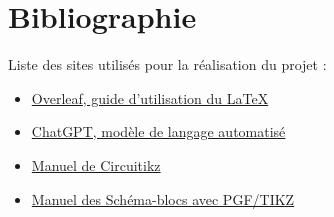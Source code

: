 \documentclass[11pt,a4paper]{article}
\begin{document}
\pagebreak
\section{Bibliographie}
Liste des sites utilisés pour la réalisation du projet :
\begin{itemize}
\item \href{https://www.overleaf.com/learn}{Overleaf, guide d'utilisation du \LaTeX{}}
\item \href{https://chat.openai.com/chat}{ChatGPT, modèle de langage automatisé}
\item \href{https://ctan.mines-albi.fr/graphics/pgf/contrib/circuitikz/doc/circuitikzmanual.pdf}{Manuel de Circuitikz}
\item \href{https://sciences-indus-cpge.papanicola.info/IMG/pdf/schemabloc.pdf}{Manuel des Schéma-blocs avec PGF/TIKZ}
\end{itemize}
\end{document}
